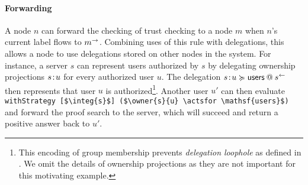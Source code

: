 \paragraph{Forwarding}
A node $n$ can forward the checking of trust checking to a node $m$ when $n$'s current label flows to $\conf{m}$. Combining uses of this rule with delegations, this allows a node to use delegations stored on other nodes in the system. For instance, a server $s$ can represent users authorized by $s$ by delegating ownership projections $\owner{s}{u}$ for every authorized user $u$. The delegation $\lb{\integ{s}}{\owner{s}{u} \actsfor \mathsf{users}}$ then represents that user $u$ is authorized\footnote{This encoding of group membership prevents \emph{delegation loophole} as defined in \cite{Arden:2015:FA:2859845.2859998}. We omit the details of ownership projections as they are not important for this motivating example.}. Another user $u'$ can then evaluate \lstinline[mathescape]!withStrategy [$\integ{s}$] ($\owner{s}{u} \actsfor \mathsf{users}$)! and forward the proof search to the server, which will succeed and return a positive answer back to $u'$.